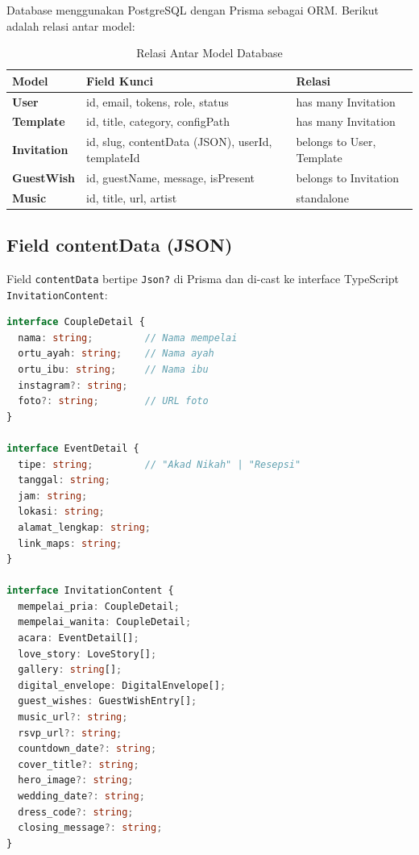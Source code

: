 \documentclass[12pt,a4paper]{article}
\begin{document}
Database menggunakan PostgreSQL dengan Prisma sebagai ORM. Berikut adalah
relasi antar model:

\begin{table}[h]
\centering
\begin{tabular}{>{\bfseries}l l l}
\toprule
Model & Field Kunci & Relasi \\
\midrule
User       & id, email, tokens, role, status   & has many Invitation \\
Template   & id, title, category, configPath    & has many Invitation \\
Invitation & id, slug, contentData (JSON), userId, templateId & belongs to User, Template \\
GuestWish  & id, guestName, message, isPresent  & belongs to Invitation \\
Music      & id, title, url, artist             & standalone \\
\bottomrule
\end{tabular}
\caption{Relasi Antar Model Database}
\end{table}

\subsection{Field contentData (JSON)}

Field \texttt{contentData} bertipe \texttt{Json?} di Prisma dan di-cast ke
interface TypeScript \texttt{InvitationContent}:

\begin{lstlisting}[language=typescript, caption=Interface InvitationContent]
interface CoupleDetail {
  nama: string;         // Nama mempelai
  ortu_ayah: string;    // Nama ayah
  ortu_ibu: string;     // Nama ibu
  instagram?: string;
  foto?: string;        // URL foto
}

interface EventDetail {
  tipe: string;         // "Akad Nikah" | "Resepsi"
  tanggal: string;
  jam: string;
  lokasi: string;
  alamat_lengkap: string;
  link_maps: string;
}

interface InvitationContent {
  mempelai_pria: CoupleDetail;
  mempelai_wanita: CoupleDetail;
  acara: EventDetail[];
  love_story: LoveStory[];
  gallery: string[];
  digital_envelope: DigitalEnvelope[];
  guest_wishes: GuestWishEntry[];
  music_url?: string;
  rsvp_url?: string;
  countdown_date?: string;
  cover_title?: string;
  hero_image?: string;
  wedding_date?: string;
  dress_code?: string;
  closing_message?: string;
}
\end{lstlisting}
\end{document}
